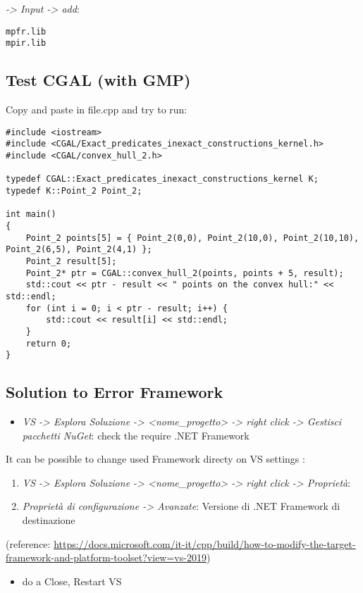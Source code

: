 \documentclass[11pt, english, openany]{report}
\begin{document}
\begin{appendices}
\begin{enumerate}
	 \textit{-> Input -> add}:
\begin{lstlisting}
mpfr.lib
mpir.lib	
\end{lstlisting}
\end{enumerate}
	
\subsection{Test CGAL (with GMP)}
Copy and paste in file.cpp and try to run:

\begin{lstlisting}
#include <iostream>
#include <CGAL/Exact_predicates_inexact_constructions_kernel.h>
#include <CGAL/convex_hull_2.h>

typedef CGAL::Exact_predicates_inexact_constructions_kernel K;
typedef K::Point_2 Point_2;
    
int main()
{
	Point_2 points[5] = { Point_2(0,0), Point_2(10,0), Point_2(10,10), Point_2(6,5), Point_2(4,1) };
	Point_2 result[5];
	Point_2* ptr = CGAL::convex_hull_2(points, points + 5, result);
	std::cout << ptr - result << " points on the convex hull:" << std::endl;
	for (int i = 0; i < ptr - result; i++) {
		std::cout << result[i] << std::endl;
	}
	return 0;
}
\end{lstlisting}

\subsection{Solution to Error Framework}
\begin{itemize}
\item \textit{VS -> Esplora Soluzione -> <nome\_progetto> -> right click -> Gestisci pacchetti NuGet}: check the require .NET Framework
\end{itemize}
It can be possible to change used Framework directy on VS settings :
\begin{enumerate}
\item \textit{VS -> Esplora Soluzione -> <nome\_progetto> -> right click -> Proprietà}:
\item \textit{Proprietà di configurazione -> Avanzate}: Versione di .NET Framework di destinazione
\end{enumerate}
(reference: \href{https://docs.microsoft.com/it-it/cpp/build/how-to-modify-the-target-framework-and-platform-toolset?view=vs-2019}{https://docs.microsoft.com/it-it/cpp/build/how-to-modify-the-target-framework-and-platform-toolset?view=vs-2019})
\begin{itemize}
\item do a Close, Restart VS
\end{itemize}


\end{appendices}
\end{document}

